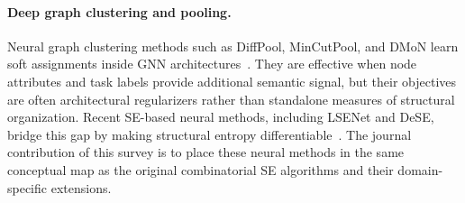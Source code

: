\paragraph{Deep graph clustering and pooling.}
Neural graph clustering methods such as DiffPool, MinCutPool, and DMoN learn
soft assignments inside GNN architectures~\cite{ying2018diffpool,bianchi2020mincutpool,tsitsulin2020dmon}.
They are effective when node attributes and task labels provide additional
semantic signal, but their objectives are often architectural regularizers
rather than standalone measures of structural organization.
Recent SE-based neural methods, including LSENet and DeSE, bridge this gap by
making structural entropy differentiable~\cite{sun2024lsenet,zhang2025dese}.
The journal contribution of this survey is to place these neural methods in
the same conceptual map as the original combinatorial SE algorithms and their
domain-specific extensions.

